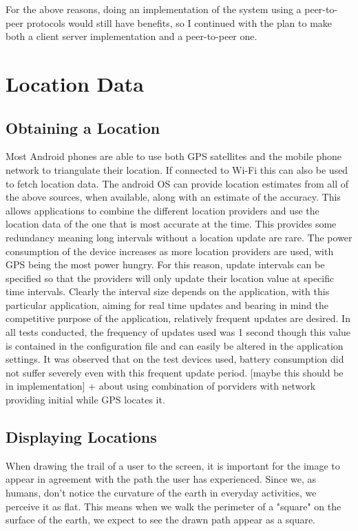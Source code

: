 For the above reasons, doing an implementation of the system using a peer-to-peer protocols would still have benefits, so I continued with the plan to make both a client server implementation and a peer-to-peer one.

\section{Location Data}

\subsection{Obtaining a Location}

Most Android phones are able to use both GPS satellites and the mobile phone network to triangulate their location. If connected to Wi-Fi this can also be used to fetch location data.
The android OS can provide location estimates from all of the above sources, when available, along with an estimate of the accuracy. This allows applications to combine the different location providers and use the location data of the one that is most accurate at the time. This provides some redundancy meaning long intervals without a location update are rare. The power consumption of the device increases as more location providers are used, with GPS being the most power hungry. For this reason, update intervals can be specified so that the providers will only update their location value at specific time intervals. Clearly the interval size depends on the application, with this particular application, aiming for real time updates and bearing in mind the competitive purpose of the application, relatively frequent updates are desired.
In all tests conducted, the frequency of updates used was 1 second though this value is contained in the configuration file and can easily be altered in the application settings. It was observed that on the test devices used, battery consumption did not suffer severely even with this frequent update period. [maybe this should be in implementation] + about using combination of porviders with network providing initial while GPS locates it.

\subsection{Displaying Locations}
When drawing the trail of a user to the screen, it is important for the image to appear in agreement with the path the user has experienced. Since we, as humans, don't notice the curvature of the earth in everyday activities, we perceive it as flat. This means when we walk the perimeter of a "square" on the surface of the earth, we expect to see the drawn path appear as a square.

